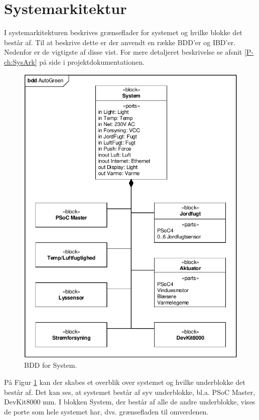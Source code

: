 \section{Systemarkitektur}
\label{ch:Systemarkitektur}

I systemarkitekturen beskrives grænseflader for systemet og hvilke blokke det består af. Til at beskrive dette er der anvendt en række BDD'er og IBD'er. Nedenfor er de vigtigste af disse vist. For mere detaljeret beskrivelse se afsnit \ref{P-ch:SysArk}  på side \pageref{P-ch:SysArk} i projektdokumentationen.

\begin{figure}[h]
\centering 
\includegraphics[scale=1.0, trim=0 0 0 0, clip=true] {../fig/bdd_system.pdf}
\caption{BDD for System.}
\label{fig:bdd_system}
\end{figure}

På Figur \ref{fig:bdd_system} kan der skabes et overblik over systemet og hvilke underblokke det består af. Det kan ses, at systemet består af syv underblokke, bl.a. PSoC Master, DevKit8000 mm. I blokken System, der består af alle de andre underblokke, vises de porte som hele systemet har, dvs. grænsefladen til omverdenen.

